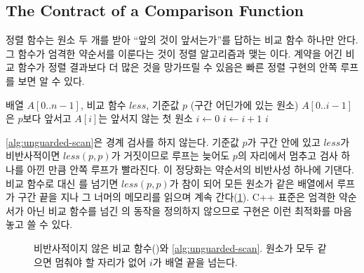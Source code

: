 \subsection{The Contract of a Comparison Function}

정렬 함수는 원소 두 개를 받아 ``앞의 것이 앞서는가''를 답하는 비교 함수 하나만 안다. 그 함수가 엄격한 약순서를 이룬다는 것이 정렬 알고리즘과 맺는 이다. 계약을 어긴 비교 함수가 정렬 결과보다 더 많은 것을 망가뜨릴 수 있음은 빠른 정렬 구현의 안쪽 루프를 보면 알 수 있다.

\begin{algorithm}[htbp]
\begin{algorithmic}[1]
\Require 배열 $A[0..n-1]$, 비교 함수 $\mathit{less}$, 기준값 $p$ (구간 어딘가에 있는 원소)
\Ensure $A[0..i-1]$은 $p$보다 앞서고 $A[i]$는 앞서지 않는 첫 원소
\State $i\gets0$
 
  \State $i\gets i+1$
\EndWhile
\State \Return $i$
\end{algorithmic}
\caption{경계 검사 없는 분할의 안쪽 루프}
\label{alg:unguarded-scan}
\end{algorithm}

\cref{alg:unguarded-scan}은 경계 검사를 하지 않는다. 기준값 $p$가 구간 안에 있고 $\mathit{less}$가 비반사적이면 $\mathit{less}(p,p)$가 거짓이므로 루프는 늦어도 $p$의 자리에서 멈추고 검사 하나를 아낀 만큼 안쪽 루프가 빨라진다. 이 정당화는 약순서의 비반사성 하나에 기댄다. 비교 함수로 \code{<} 대신 \code{<=}를 넘기면 $\mathit{less}(p,p)$가 참이 되어 모든 원소가 같은 배열에서 루프가 구간 끝을 지나 그 너머의 메모리를 읽으며 계속 간다(\cref{fig:unguarded-overrun}). C++ 표준은 엄격한 약순서가 아닌 비교 함수를 넘긴 의 동작을 정의하지 않으므로\cite{iso14882-2020} 구현은 이런 최적화를 마음 놓고 쓸 수 있다.

\begin{figure}[htbp]
\centering
{}
\caption{비반사적이지 않은 비교 함수(\code{<=})와 \cref{alg:unguarded-scan}. 원소가 모두 같으면 멈춰야 할 자리가 없어 $i$가 배열 끝을 넘는다.}
\label{fig:unguarded-overrun}
\end{figure}

